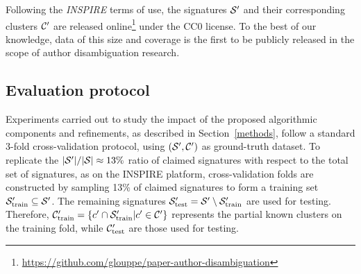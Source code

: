 \documentclass{article}
\begin{document}
Following the \emph{INSPIRE} terms of use, the signatures ${\cal S}^\prime$ and their
corresponding clusters ${\cal C}^\prime$ are released
online\footnote{\url{https://github.com/glouppe/paper-author-disambiguation}}
under the CC0 license.
To the best of our knowledge, data of this size and coverage is the first to be publicly
released in the scope of author disambiguation research.

\subsection{Evaluation protocol}

Experiments carried out to study the impact of the proposed algorithmic
components and refinements, as described in Section~\ref{methods}, follow a
standard 3-fold cross-validation protocol, using $({\cal S}^\prime, {\cal
C}^\prime)$ as ground-truth dataset. To replicate the $|{\cal S}^\prime| /
|{\cal S}| \approx 13\%$ ratio of claimed signatures with respect to the total
set of signatures, as on the INSPIRE platform, cross-validation folds are
constructed by sampling 13\% of claimed signatures to form a training set ${\cal
S}_\text{train}^\prime \subseteq {\cal S}^\prime$.
The remaining signatures ${\cal S}_\text{test}^\prime = {\cal S}^\prime \setminus {\cal
S}_\text{train}^\prime$ are used for testing.
Therefore, ${\cal C}_\text{train}^\prime = \{ c^\prime \cap {\cal S}_\text{train}^\prime | c^\prime \in {\cal C}^\prime
\}$ represents the partial known clusters on the training fold, while ${\cal
C}_\text{test}^\prime$ are those used for testing.
\end{document}
